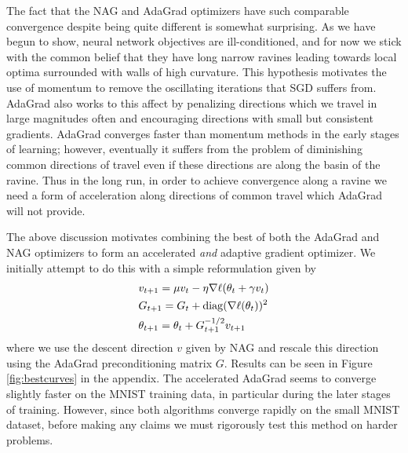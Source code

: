 The fact that the NAG and AdaGrad optimizers have such comparable convergence
despite being quite different is somewhat surprising. As we have begun to show,
neural network objectives are ill-conditioned, and for now we stick with the common belief
that they have long narrow ravines leading towards local optima surrounded with
walls of high curvature. This hypothesis motivates the use of momentum to remove the
oscillating iterations that SGD suffers from. AdaGrad also works to this affect
by penalizing directions which we travel in large magnitudes often and
encouraging directions with small but consistent gradients. AdaGrad converges
faster than momentum methods in the early stages of learning; however,
eventually it suffers from the problem of diminishing common directions of travel
even if these directions are along the basin of the ravine. Thus in the long
run, in order to achieve convergence along a ravine we need a form of
acceleration along directions of common travel which AdaGrad will not provide. 

The above discussion motivates combining the best of both the AdaGrad and
NAG optimizers to form an accelerated {\it and} adaptive gradient optimizer. We
initially attempt to do this with a simple reformulation given by
\begin{align*}
&v_{t+1} = \mu v_t - \eta \nabla \ell (\theta_t + \gamma v_t) \\
&G_{t+1} = G_{t} + \operatorname*{diag}(\nabla \ell (\theta_t))^2 \\
&\theta_{t+1} = \theta_t + G_{t+1}^{-1/2} v_{t+1}
\end{align*}
where we use the descent direction $v$ given by NAG and rescale this direction
using the AdaGrad preconditioning matrix $G$. Results can be seen in Figure \ref{fig:bestcurves} 
in the appendix. The accelerated AdaGrad seems to converge slightly faster on
the MNIST training data, in particular during the later stages of training.
However, since both algorithms converge rapidly on the small MNIST
dataset, before making any claims we must rigorously test this method on harder
problems.

